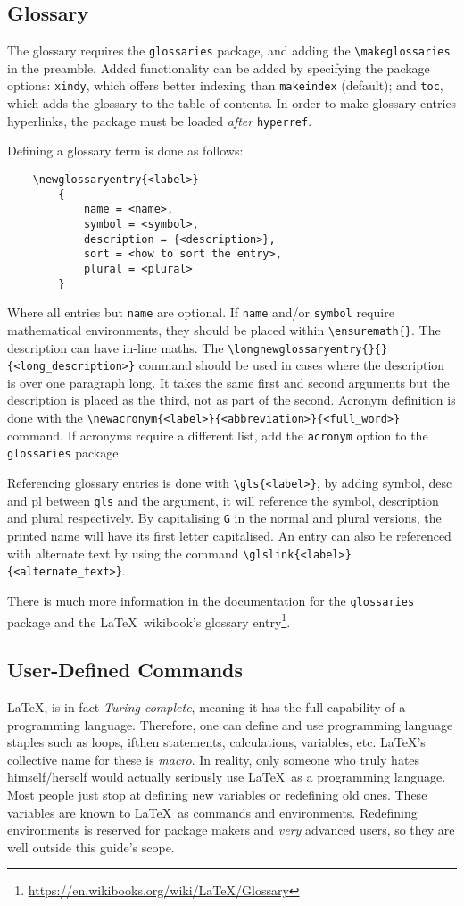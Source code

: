 \subsection{Glossary}
%
The glossary requires the \verb|glossaries| package, and adding the
\verb|\makeglossaries| in the preamble.  Added functionality can be
added by specifying the package options: \verb|xindy|, which offers
better indexing than \verb|makeindex| (default); and \verb|toc|, which
adds the glossary to the table of contents.  In order to make glossary
entries hyperlinks, the package must be loaded \emph{after}
\verb|hyperref|.

Defining a glossary term is done as follows:
\begin{verbatim}
	\newglossaryentry{<label>}
	    {
	        name = <name>,
	        symbol = <symbol>,
	        description = {<description>},
	        sort = <how to sort the entry>,
	        plural = <plural>
	    }
\end{verbatim}
Where all entries but \verb|name| are optional.  If \verb|name| and/or
\verb|symbol| require mathematical environments, they should be placed
within \verb|\ensuremath{}|.  The description can have in-line maths.
The \verb|\longnewglossaryentry{}{}{<long_description>}| command
should be used in cases where the description is over one paragraph
long. It takes the same first and second arguments but the description
is placed as the third, not as part of the second.  Acronym definition
is done with the
\verb|\newacronym{<label>}{<abbreviation>}{<full_word>}| command.  If
acronyms require a different list, add the \verb|acronym| option to
the \verb|glossaries| package.

Referencing glossary entries is done with \verb|\gls{<label>}|, by
adding symbol, desc and pl between \verb|gls| and the argument, it
will reference the symbol, description and plural respectively.  By
capitalising \verb|G| in the normal and plural versions, the printed
name will have its first letter capitalised.  An entry can also be
referenced with alternate text by using the command
\verb|\glslink{<label>}{<alternate_text>}|.

There is much more information in the documentation for the
\verb|glossaries| package and the \LaTeX~wikibook's glossary
entry\footnote{\url{https://en.wikibooks.org/wiki/LaTeX/Glossary}}.
%
\subsection{User-Defined Commands}
%
\LaTeX, is in fact \emph{Turing complete}, meaning it has the full
capability of a programming language.  Therefore, one can define and
use programming language staples such as loops, ifthen statements,
calculations, variables, etc. \LaTeX's collective name for these is
\emph{macro}.  In reality, only someone who truly hates
himself/herself would actually seriously use \LaTeX~as a programming
language.  Most people just stop at defining new variables or
redefining old ones.  These variables are known to \LaTeX~as commands
and environments.  Redefining environments is reserved for package
makers and \emph{very} advanced users, so they are well outside this
guide's scope.


